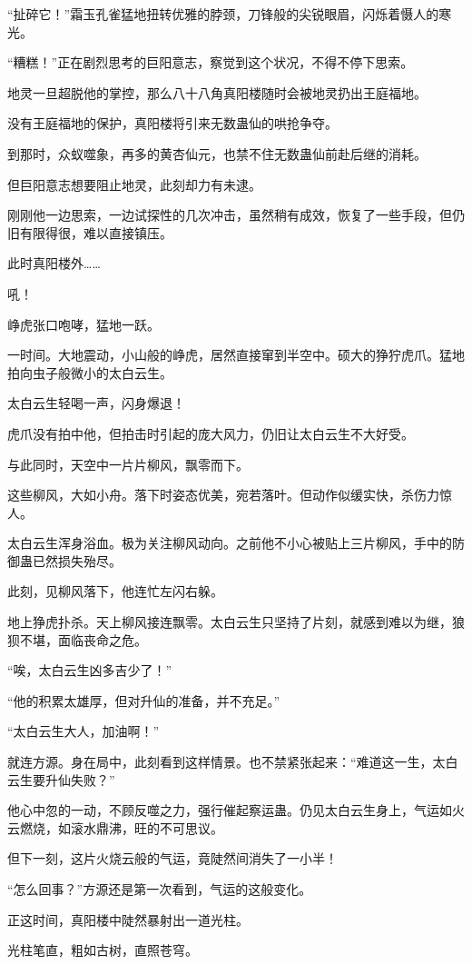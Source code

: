 \begin{this_body}
“扯碎它！”霜玉孔雀猛地扭转优雅的脖颈，刀锋般的尖锐眼眉，闪烁着慑人的寒光。

“糟糕！”正在剧烈思考的巨阳意志，察觉到这个状况，不得不停下思索。

地灵一旦超脱他的掌控，那么八十八角真阳楼随时会被地灵扔出王庭福地。

没有王庭福地的保护，真阳楼将引来无数蛊仙的哄抢争夺。

到那时，众蚁噬象，再多的黄杏仙元，也禁不住无数蛊仙前赴后继的消耗。

但巨阳意志想要阻止地灵，此刻却力有未逮。

刚刚他一边思索，一边试探性的几次冲击，虽然稍有成效，恢复了一些手段，但仍旧有限得很，难以直接镇压。

此时真阳楼外……

吼！

峥虎张口咆哮，猛地一跃。

一时间。大地震动，小山般的峥虎，居然直接窜到半空中。硕大的狰狞虎爪。猛地拍向虫子般微小的太白云生。

太白云生轻喝一声，闪身爆退！

虎爪没有拍中他，但拍击时引起的庞大风力，仍旧让太白云生不大好受。

与此同时，天空中一片片柳风，飘零而下。

这些柳风，大如小舟。落下时姿态优美，宛若落叶。但动作似缓实快，杀伤力惊人。

太白云生浑身浴血。极为关注柳风动向。之前他不小心被贴上三片柳风，手中的防御蛊已然损失殆尽。

此刻，见柳风落下，他连忙左闪右躲。

地上狰虎扑杀。天上柳风接连飘零。太白云生只坚持了片刻，就感到难以为继，狼狈不堪，面临丧命之危。

“唉，太白云生凶多吉少了！”

“他的积累太雄厚，但对升仙的准备，并不充足。”

“太白云生大人，加油啊！”

就连方源。身在局中，此刻看到这样情景。也不禁紧张起来：“难道这一生，太白云生要升仙失败？”

他心中忽的一动，不顾反噬之力，强行催起察运蛊。仍见太白云生身上，气运如火云燃烧，如滚水鼎沸，旺的不可思议。

但下一刻，这片火烧云般的气运，竟陡然间消失了一小半！

“怎么回事？”方源还是第一次看到，气运的这般变化。

正这时间，真阳楼中陡然暴射出一道光柱。

光柱笔直，粗如古树，直照苍穹。


\end{this_body}
